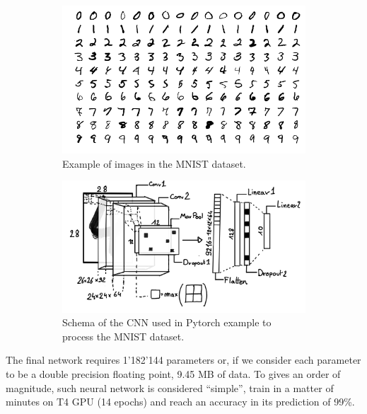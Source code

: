 \documentclass[../main.tex]{subfiles}
\begin{document}
\begin{figure}[ht]
  \centering
  \begin{subfigure}[t]{0.48\linewidth}
    \includegraphics[width=\linewidth]{images/ml/MnistExamples.png}
    \caption{Example of images in the MNIST dataset.}
    \label{fig:ml:mnist}
  \end{subfigure}
  \hfill
  \begin{subfigure}[t]{0.48\linewidth}
    \includegraphics[width=\linewidth]{images/ml/mnist_cnn.jpg}
    \caption{Schema of the CNN used in Pytorch example to process the MNIST dataset.}
    \label{fig:ml:cnn_mnist}
  \end{subfigure}
  \caption{}
\end{figure}

The final network requires 1'182'144 parameters or, if we consider each parameter to be a double precision floating point, 9.45 MB of data. To gives an order of magnitude, such neural network is considered ``simple'', train in a matter of minutes on T4 GPU \cite{noauthor_nvidia_nodate} (14 epochs) and reach an accuracy in its prediction of 99\%.
\end{document}
